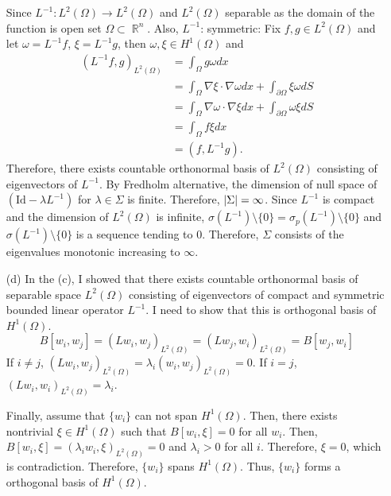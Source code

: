 \documentclass{article}
\DeclareMathOperator{\rr}{\mathbb{R}}
\begin{document}
\begin{enumerate}
Since $L^{-1}:L^2(\Omega)\rightarrow L^2(\Omega)$ and $L^2(\Omega)$ separable as the domain of the function is open set $\Omega\subset \rr^n$.
Also, $L^{-1}$: symmetric: Fix $f,g\in L^2(\Omega)$ and let $\omega=L^{-1}f$, $\xi=L^{-1}g$, then $\omega,\xi\in H^1(\Omega)$ and
\begin{equation*}
\begin{split}
(L^{-1}f, g)_{L^2(\Omega)}&=\int_\Omega g\omega dx\\
&=\int_\Omega \nabla \xi\cdot \nabla \omega dx+\int_{\partial \Omega} \xi \omega dS \\
&=\int_\Omega \nabla \omega\cdot \nabla \xi dx+\int_{\partial \Omega} \omega\xi dS \\
&=\int_\Omega f \xi dx \\
&=(f, L^{-1}g).
\end{split}
\end{equation*}
Therefore, there exists countable orthonormal basis of $L^2(\Omega)$ consisting of eigenvectors of $L^{-1}$. By Fredholm alternative, the dimension of null space of $\left(\text{Id}-\lambda L^{-1}\right)$ for $\lambda\in \Sigma$ is finite. Therefore, $\abs{\Sigma}=\infty$. Since $L^{-1}$ is compact and the dimension of $L^2(\Omega)$ is infinite, $\sigma(L^{-1})\setminus\{0\}=\sigma_p(L^{-1})\setminus\{0\}$ and $\sigma(L^{-1})\setminus\{0\}$ is a sequence tending to $0$. Therefore, $\Sigma$ consists of the eigenvalues monotonic increasing to $\infty$.
\item[(d)] In the (c), I showed that there exists countable orthonormal basis of separable space $L^2(\Omega)$ consisting of eigenvectors of compact and symmetric bounded linear operator $L^{-1}$. I need to show that this is orthogonal basis of $H^1(\Omega)$.
\begin{equation*}
B[w_i,w_j]=(Lw_i, w_j)_{L^2(\Omega)}=(Lw_j, w_i)_{L^2(\Omega)}=B[w_j,w_i]
\end{equation*}
If $i\neq j$, $(Lw_i, w_j)_{L^2(\Omega)}=\lambda_i (w_i,w_j)_{L^2(\Omega)}=0$. If $i=j$, $(Lw_i, w_i)_{L^2(\Omega)}=\lambda_i$. 

Finally, assume that $\{w_i\}$ can not span $H^1(\Omega)$. Then, there exists nontrivial $\xi\in H^1(\Omega)$ such that $B[w_i,\xi]=0$ for all $w_i$. Then, $B[w_i, \xi]=(\lambda_i w_i, \xi)_{L^2(\Omega)}=0$ and $\lambda_i>0$ for all $i$. Therefore, $\xi=0$, which is contradiction. Therefore, $\{w_i\}$ spans $H^1(\Omega)$.
Thus, $\{w_i\}$ forms a orthogonal basis of $H^1(\Omega)$.
\end{enumerate}
\end{document}

